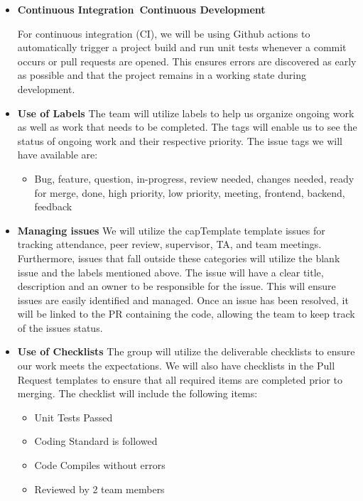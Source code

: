 \documentclass{article}
\begin{document}
\begin{itemize}
	\item\textbf{Continuous Integration\ Continuous Development}
	
  For continuous integration (CI), we will be using Github actions to automatically trigger a project build and run unit tests 
  whenever a commit occurs or pull requests are opened. This ensures errors are discovered as early as possible and that the project remains in a working state during development. 

  \item \textbf{Use of Labels} \newline
  The team will utilize labels to help us organize ongoing work as well as work that needs to be completed. The tags will enable us to see the status of ongoing work and their respective priority. 
    The issue tags we will have available are:
     \begin{itemize} 
        \item Bug, feature, question, in-progress, review needed, changes needed, ready for merge, done, high priority, low priority, meeting, frontend, backend, feedback 
    \end{itemize}
   \item \textbf{Managing issues}\newline
  We will utilize the capTemplate template issues for tracking attendance, peer review, supervisor, TA, and team meetings. Furthermore, issues that fall outside these categories will utilize the blank issue and the labels mentioned above. \newline
  The issue will have a clear title, description and an owner to be responsible for the issue. This will ensure issues are easily identified and managed. Once an issue has been resolved, it will be linked to the PR containing the code, allowing the team to keep track of the issues status.
  \item \textbf{Use of Checklists} \newline
  The group will utilize the deliverable checklists to ensure our work meets the expectations. 
  We will also have checklists in the Pull Request templates to ensure that all required items are completed prior to merging. The checklist will include the following items: 
  \begin{itemize}
    \item Unit Tests Passed
    \item Coding Standard is followed 
    \item Code Compiles without errors
    \item Reviewed by 2 team members
  \end{itemize}
  \end{itemize}
\end{document}
